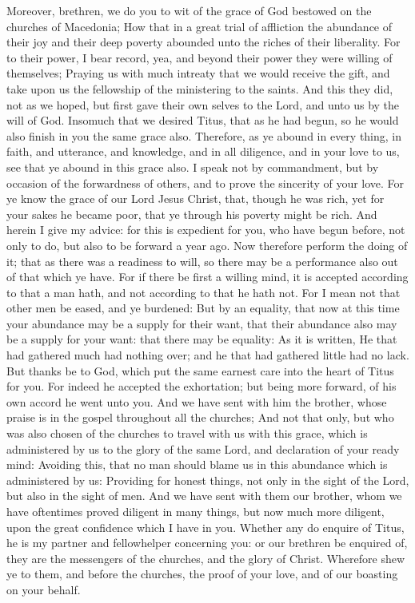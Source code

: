  Moreover, brethren, we do you to wit of the grace of God
bestowed on the churches of Macedonia;  How that in a
great trial of affliction the abundance of their joy and their deep
poverty abounded unto the riches of their liberality.  For
to their power, I bear record, yea, and beyond their power they were
willing of themselves;  Praying us with much intreaty that
we would receive the gift, and take upon us the fellowship of the
ministering to the saints.  And this they did, not as we
hoped, but first gave their own selves to the Lord, and unto us by the
will of God.  Insomuch that we desired Titus, that as he
had begun, so he would also finish in you the same grace also.
 Therefore, as ye abound in every thing, in faith, and
utterance, and knowledge, and in all diligence, and in your love to us,
see that ye abound in this grace also.  I speak not by
commandment, but by occasion of the forwardness of others, and to prove
the sincerity of your love.  For ye know the grace of our
Lord Jesus Christ, that, though he was rich, yet for your sakes he
became poor, that ye through his poverty might be rich. 
And herein I give my advice: for this is expedient for you, who have
begun before, not only to do, but also to be forward a year ago.
 Now therefore perform the doing of it; that as there was
a readiness to will, so there may be a performance also out of that
which ye have.  For if there be first a willing mind, it
is accepted according to that a man hath, and not according to that he
hath not.  For I mean not that other men be eased, and ye
burdened:  But by an equality, that now at this time your
abundance may be a supply for their want, that their abundance also may
be a supply for your want: that there may be equality: 
As it is written, He that had gathered much had nothing over; and he
that had gathered little had no lack.  But thanks be to
God, which put the same earnest care into the heart of Titus for you.
 For indeed he accepted the exhortation; but being more
forward, of his own accord he went unto you.  And we have
sent with him the brother, whose praise is in the gospel throughout all
the churches;  And not that only, but who was also chosen
of the churches to travel with us with this grace, which is administered
by us to the glory of the same Lord, and declaration of your ready mind:
 Avoiding this, that no man should blame us in this
abundance which is administered by us:  Providing for
honest things, not only in the sight of the Lord, but also in the sight
of men.  And we have sent with them our brother, whom we
have oftentimes proved diligent in many things, but now much more
diligent, upon the great confidence which I have in you. 
Whether any do enquire of Titus, he is my partner and fellowhelper
concerning you: or our brethren be enquired of, they are the messengers
of the churches, and the glory of Christ.  Wherefore shew
ye to them, and before the churches, the proof of your love, and of our
boasting on your behalf.


